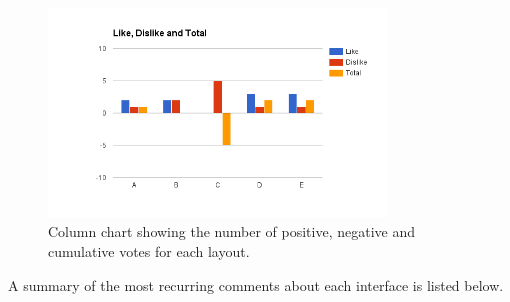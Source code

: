 \documentclass{mproj}
\begin{document}
\begin{figure}[h]
	\centering
	\includegraphics[width=0.8\textwidth]{images/layout_feedback}
	\caption{Column chart showing the number of positive, negative and cumulative votes for each layout.}
	\label{fig:layout_feedback}
\end{figure}

A summary of the most recurring comments about each interface is listed below.
\end{document}
